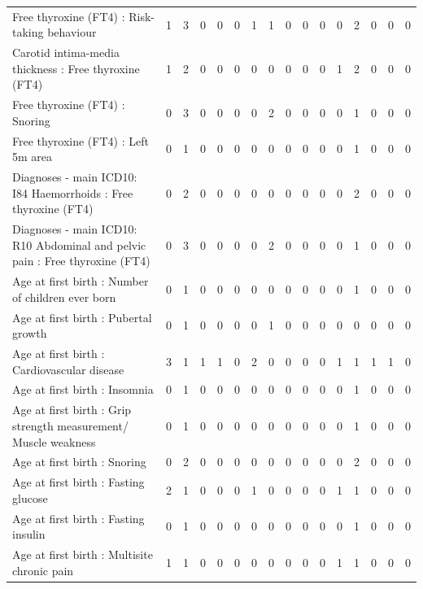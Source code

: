 \begin{table}[ht]
\begin{tabular}{lrrrrrrrrrrrrrrr}
  Free thyroxine (FT4) : Risk-taking behaviour &   1 &   3 &   0 &   0 &   0 &   1 &   1 &   0 &   0 &   0 &   0 &   2 &   0 &   0 &   0 \\ 
  Carotid intima-media thickness : Free thyroxine (FT4) &   1 &   2 &   0 &   0 &   0 &   0 &   0 &   0 &   0 &   0 &   1 &   2 &   0 &   0 &   0 \\ 
  Free thyroxine (FT4) : Snoring &   0 &   3 &   0 &   0 &   0 &   0 &   2 &   0 &   0 &   0 &   0 &   1 &   0 &   0 &   0 \\ 
  Free thyroxine (FT4) : Left 5m area &   0 &   1 &   0 &   0 &   0 &   0 &   0 &   0 &   0 &   0 &   0 &   1 &   0 &   0 &   0 \\ 
  Diagnoses - main ICD10: I84 Haemorrhoids : Free thyroxine (FT4) &   0 &   2 &   0 &   0 &   0 &   0 &   0 &   0 &   0 &   0 &   0 &   2 &   0 &   0 &   0 \\ 
  Diagnoses - main ICD10: R10 Abdominal and pelvic pain : Free thyroxine (FT4) &   0 &   3 &   0 &   0 &   0 &   0 &   2 &   0 &   0 &   0 &   0 &   1 &   0 &   0 &   0 \\ 
  Age at first birth  : Number of children ever born  &   0 &   1 &   0 &   0 &   0 &   0 &   0 &   0 &   0 &   0 &   0 &   1 &   0 &   0 &   0 \\ 
  Age at first birth  : Pubertal growth  &   0 &   1 &   0 &   0 &   0 &   0 &   1 &   0 &   0 &   0 &   0 &   0 &   0 &   0 &   0 \\ 
  Age at first birth  : Cardiovascular disease &   3 &   1 &   1 &   1 &   0 &   2 &   0 &   0 &   0 &   0 &   1 &   1 &   1 &   1 &   0 \\ 
  Age at first birth  : Insomnia &   0 &   1 &   0 &   0 &   0 &   0 &   0 &   0 &   0 &   0 &   0 &   1 &   0 &   0 &   0 \\ 
  Age at first birth  : Grip strength measurement/ Muscle weakness &   0 &   1 &   0 &   0 &   0 &   0 &   0 &   0 &   0 &   0 &   0 &   1 &   0 &   0 &   0 \\ 
  Age at first birth  : Snoring &   0 &   2 &   0 &   0 &   0 &   0 &   0 &   0 &   0 &   0 &   0 &   2 &   0 &   0 &   0 \\ 
  Age at first birth  : Fasting glucose &   2 &   1 &   0 &   0 &   0 &   1 &   0 &   0 &   0 &   0 &   1 &   1 &   0 &   0 &   0 \\ 
  Age at first birth  : Fasting insulin &   0 &   1 &   0 &   0 &   0 &   0 &   0 &   0 &   0 &   0 &   0 &   1 &   0 &   0 &   0 \\ 
  Age at first birth  : Multisite chronic pain &   1 &   1 &   0 &   0 &   0 &   0 &   0 &   0 &   0 &   0 &   1 &   1 &   0 &   0 &   0 \\ 

\end{tabular}
\end{table}
